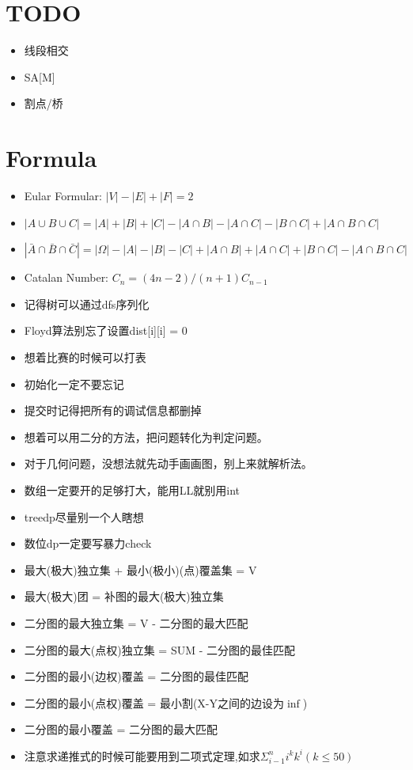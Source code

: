 \documentclass[
	10pt,
	twocolumn,
	a4paper,
]{article}
\begin{document}
\section{TODO}
\begin{itemize}
\item 线段相交
\item SA[M]
\item 割点/桥
\end{itemize}
\section{Formula}
\begin{itemize} 
\setlength{\itemsep}{0pt}
\item Eular Formular: $|V| - |E| + |F| = 2$
\item $|A \cup B \cup C | = |A| + |B| + |C| - |A \cap B| - |A \cap C| - |B \cap C| + |A \cap B \cap C|$
\item $|\bar A \cap \bar B \cap \bar C | = |\Omega| - |A| - |B| - |C| + |A \cap B| + |A \cap C| + |B \cap C| - |A \cap B \cap C| $
\item Catalan Number: $C_n = (4n-2) / (n+1) C_{n-1}$
\item 记得树可以通过dfs序列化
\item Floyd算法别忘了设置dist[i][i] = 0
\item 想着比赛的时候可以打表
\item 初始化一定不要忘记
\item 提交时记得把所有的调试信息都删掉
\item 想着可以用二分的方法，把问题转化为判定问题。
\item 对于几何问题，没想法就先动手画画图，别上来就解析法。
\item 数组一定要开的足够打大，能用LL就别用int
\item treedp尽量别一个人瞎想
\item 数位dp一定要写暴力check
\item 最大(极大)独立集 + 最小(极小)(点)覆盖集 = V
\item 最大(极大)团 = 补图的最大(极大)独立集
\item 二分图的最大独立集 = V - 二分图的最大匹配
\item 二分图的最大(点权)独立集 = SUM - 二分图的最佳匹配
\item 二分图的最小(边权)覆盖 = 二分图的最佳匹配
\item 二分图的最小(点权)覆盖 = 最小割(X-Y之间的边设为$\inf$)
\item 二分图的最小覆盖 = 二分图的最大匹配
\item 注意求递推式的时候可能要用到二项式定理,如求$ \Sigma_{i-1}^n{i^k k^i} (k \le 50) $
\end{itemize} 
\end{document}
